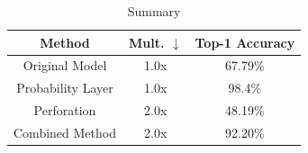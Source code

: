 \documentclass[pageno]{jpaper}
\begin{document}



\begin{table}[h]
    \caption{Summary}
    \label{tab:my_label}

    \centering
    \begin{tabular}{ ccc } 
     Method & Mult. $\downarrow$ & Top-1 Accuracy \\ 
     \hline
     Original Model & 1.0x & 67.79\% \\
     Probability Layer & 1.0x & 98.4\% \\ 
     Perforation & 2.0x & 48.19\% \\ 
     \hline
     Combined Method & 2.0x & 92.20\%
    \end{tabular}
\end{table}
\end{document}
